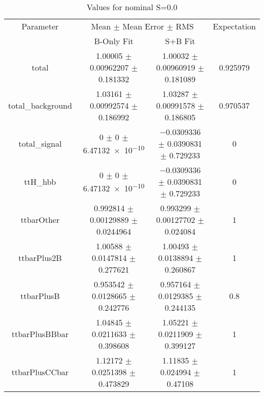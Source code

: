 \begin{table}
\centering
\caption{Values for nominal S=0.0}
\begin{tabular}{cccc}
\toprule
Parameter & \multicolumn{2}{c}{Mean $\pm$ Mean Error $\pm$ RMS} & Expectation\\
 & B-Only Fit & S+B Fit & \\
\midrule
total & \num{1.00005} $\pm$ \num{0.00962207} $\pm$ \num{0.181332} & \num{1.00032} $\pm$ \num{0.00960919} $\pm$ \num{0.181089} & \num{0.925979}\\
total\_background & \num{1.03161} $\pm$ \num{0.00992574} $\pm$ \num{0.186992} & \num{1.03287} $\pm$ \num{0.00991578} $\pm$ \num{0.186805} & \num{0.970537}\\
total\_signal & \num{0} $\pm$ \num{0} $\pm$ \num{6.47132e-10} & \num{-0.0309336} $\pm$ \num{0.0390831} $\pm$ \num{0.729233} & \num{0}\\
ttH\_hbb & \num{0} $\pm$ \num{0} $\pm$ \num{6.47132e-10} & \num{-0.0309336} $\pm$ \num{0.0390831} $\pm$ \num{0.729233} & \num{0}\\
ttbarOther & \num{0.992814} $\pm$ \num{0.00129889} $\pm$ \num{0.0244964} & \num{0.993299} $\pm$ \num{0.00127702} $\pm$ \num{0.024084} & \num{1}\\
ttbarPlus2B & \num{1.00588} $\pm$ \num{0.0147814} $\pm$ \num{0.277621} & \num{1.00493} $\pm$ \num{0.0138894} $\pm$ \num{0.260867} & \num{1}\\
ttbarPlusB & \num{0.953542} $\pm$ \num{0.0128665} $\pm$ \num{0.242776} & \num{0.957164} $\pm$ \num{0.0129385} $\pm$ \num{0.244135} & \num{0.8}\\
ttbarPlusBBbar & \num{1.04845} $\pm$ \num{0.0211633} $\pm$ \num{0.398608} & \num{1.05221} $\pm$ \num{0.0211909} $\pm$ \num{0.399127} & \num{1}\\
ttbarPlusCCbar & \num{1.12172} $\pm$ \num{0.0251398} $\pm$ \num{0.473829} & \num{1.11835} $\pm$ \num{0.024994} $\pm$ \num{0.47108} & \num{1}\\
\bottomrule
\end{tabular}
\end{table}